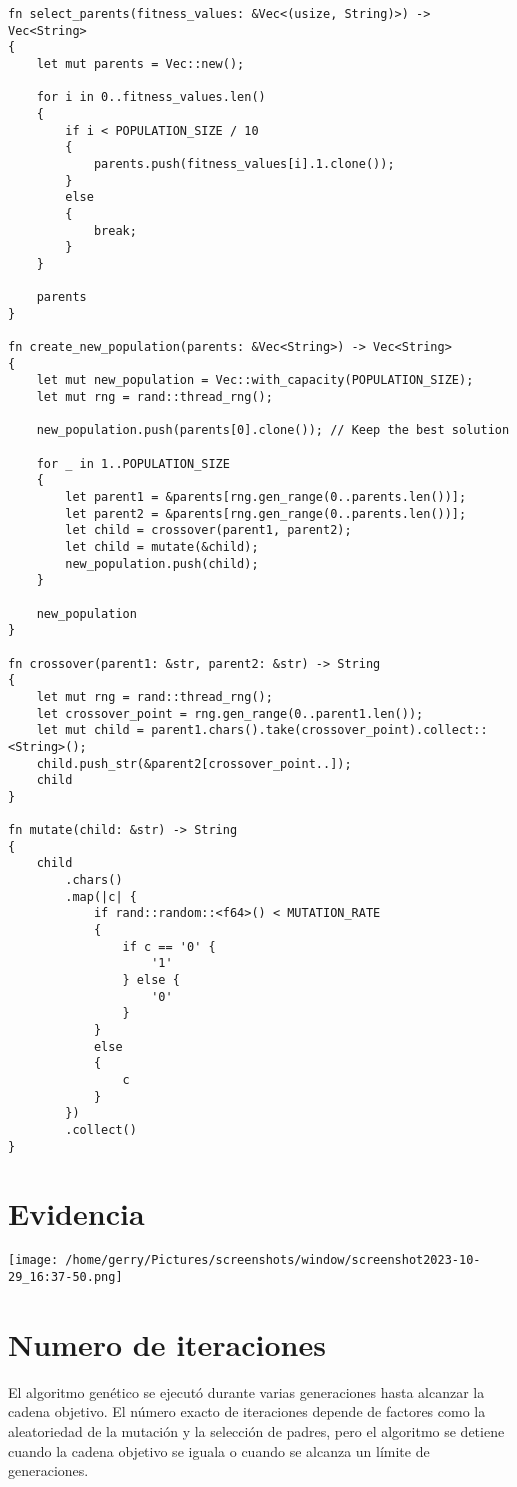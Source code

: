 \documentclass{article}
\begin{document}
\begin{verbatim}
fn select_parents(fitness_values: &Vec<(usize, String)>) -> Vec<String>
{
    let mut parents = Vec::new();

    for i in 0..fitness_values.len()
    {
        if i < POPULATION_SIZE / 10
        {
            parents.push(fitness_values[i].1.clone());
        }
        else
        {
            break;
        }
    }

    parents
}

fn create_new_population(parents: &Vec<String>) -> Vec<String>
{
    let mut new_population = Vec::with_capacity(POPULATION_SIZE);
    let mut rng = rand::thread_rng();

    new_population.push(parents[0].clone()); // Keep the best solution

    for _ in 1..POPULATION_SIZE
    {
        let parent1 = &parents[rng.gen_range(0..parents.len())];
        let parent2 = &parents[rng.gen_range(0..parents.len())];
        let child = crossover(parent1, parent2);
        let child = mutate(&child);
        new_population.push(child);
    }

    new_population
}

fn crossover(parent1: &str, parent2: &str) -> String
{
    let mut rng = rand::thread_rng();
    let crossover_point = rng.gen_range(0..parent1.len());
    let mut child = parent1.chars().take(crossover_point).collect::<String>();
    child.push_str(&parent2[crossover_point..]);
    child
}

fn mutate(child: &str) -> String
{
    child
        .chars()
        .map(|c| {
            if rand::random::<f64>() < MUTATION_RATE
            {
                if c == '0' {
                    '1'
                } else {
                    '0'
                }
            }
            else
            {
                c
            }
        })
        .collect()
}
\end{verbatim}
\section{Evidencia}
\begin{center}
    \texttt{[image: /home/gerry/Pictures/screenshots/window/screenshot2023-10-29\_16:37-50.png]}
\end{center}

\section{Numero de iteraciones}
El algoritmo genético se ejecutó durante varias generaciones hasta alcanzar la cadena objetivo.
El número exacto de iteraciones depende de factores como la aleatoriedad de la mutación y la selección
de padres, pero el algoritmo se detiene cuando la cadena objetivo se iguala o cuando se alcanza un
límite de generaciones.
\end{document}
